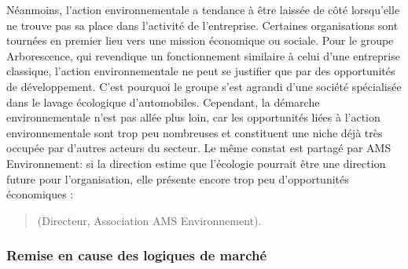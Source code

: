         Néanmoins, l'action environnementale a tendance à être laissée de côté lorsqu'elle ne trouve pas sa place dans l'activité de l'entreprise. Certaines organisations sont tournées en premier lieu vers une mission économique ou sociale. Pour le groupe Arborescence, qui revendique un fonctionnement similaire à celui d'une entreprise classique, l'action environnementale ne peut se justifier que par des opportunités de développement. C'est pourquoi le groupe s'est agrandi d'une société spécialisée dans le lavage écologique d'automobiles. Cependant, la démarche environnementale n'est pas allée plus loin, car les opportunités liées à l'action environnementale sont trop peu nombreuses et constituent une niche déjà très occupée par d'autres acteurs du secteur. Le même constat est partagé par AMS Environnement: si la direction estime que l'écologie pourrait être une direction future pour l'organisation, elle présente encore trop peu d'opportunités économiques :
        \begin{quotation}
             (Directeur, Association AMS Environnement).
        \end{quotation}

        \subsubsection{Remise en cause des logiques de marché}
        \label{subsec:contestation_marche}

